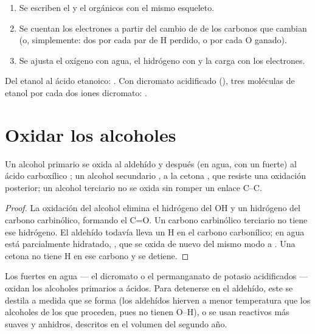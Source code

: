 \begin{method}\label{met:b1:organic-redox:balance-organic-redox}
\begin{enumerate}
  \item Se escriben el  y el  orgánicos con el mismo
        esqueleto.
  \item Se cuentan los electrones a partir del cambio de  de los carbonos que cambian (o, simplemente: dos por
        cada par de H perdido, o por cada O ganado).
  \item Se ajusta el oxígeno con agua, el hidrógeno con  y la carga
        con los electrones.
\end{enumerate}
Del etanol al ácido etanoico: .
Con dicromato acidificado (),
tres moléculas de etanol por cada dos iones dicromato:
.
\end{method}

\section{Oxidar los alcoholes}

\begin{proposition}\label{prop:b1:organic-redox:alcohol-oxidation}
Un alcohol primario  se oxida al aldehído  y después
(en agua, con un  fuerte) al ácido carboxílico ; un
alcohol secundario , a la cetona , que resiste una
oxidación posterior; un alcohol terciario  no se oxida sin
romper un enlace C--C.
\end{proposition}

\begin{proof}
La oxidación del alcohol elimina el hidrógeno del OH y un hidrógeno del
carbono carbinólico, formando el C=O. Un carbono carbinólico terciario no
tiene ese hidrógeno. El aldehído todavía lleva un H en el carbono
carbonílico; en agua está parcialmente hidratado, , que se
oxida de nuevo del mismo modo a . Una cetona no tiene H en ese
carbono y se detiene.
\end{proof}

Los  fuertes en agua --- el dicromato o el permanganato de
potasio acidificados --- oxidan los alcoholes primarios a ácidos. Para
detenerse en el aldehído, este se destila a medida que se forma (los
aldehídos hierven a menor temperatura que los alcoholes de los que
proceden, pues no tienen  O--H), o se usan reactivos
más suaves y anhidros, descritos en el volumen del segundo año.

